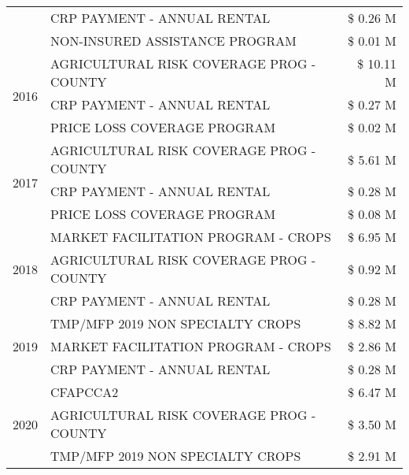 \begin{tabular}{llr}
 & CRP PAYMENT - ANNUAL RENTAL & \$ 0.26 M \\
 & NON-INSURED ASSISTANCE PROGRAM & \$ 0.01 M \\
\cline{1-3}
\multirow[t]{3}{*}{2016} & AGRICULTURAL RISK COVERAGE PROG - COUNTY      & \$ 10.11 M \\
 & CRP PAYMENT - ANNUAL RENTAL                   & \$ 0.27 M \\
 & PRICE LOSS COVERAGE PROGRAM                   & \$ 0.02 M \\
\cline{1-3}
\multirow[t]{3}{*}{2017} & AGRICULTURAL RISK COVERAGE PROG - COUNTY & \$ 5.61 M \\
 & CRP PAYMENT - ANNUAL RENTAL & \$ 0.28 M \\
 & PRICE LOSS COVERAGE PROGRAM & \$ 0.08 M \\
\cline{1-3}
\multirow[t]{3}{*}{2018} & MARKET FACILITATION PROGRAM - CROPS & \$ 6.95 M \\
 & AGRICULTURAL RISK COVERAGE PROG - COUNTY & \$ 0.92 M \\
 & CRP PAYMENT - ANNUAL RENTAL & \$ 0.28 M \\
\cline{1-3}
\multirow[t]{3}{*}{2019} & TMP/MFP 2019 NON SPECIALTY CROPS & \$ 8.82 M \\
 & MARKET FACILITATION PROGRAM - CROPS & \$ 2.86 M \\
 & CRP PAYMENT - ANNUAL RENTAL & \$ 0.28 M \\
\cline{1-3}
\multirow[t]{3}{*}{2020} & CFAPCCA2 & \$ 6.47 M \\
 & AGRICULTURAL RISK COVERAGE PROG - COUNTY & \$ 3.50 M \\
 & TMP/MFP 2019 NON SPECIALTY CROPS & \$ 2.91 M \\
\cline{1-3}
\bottomrule
\end{tabular}
